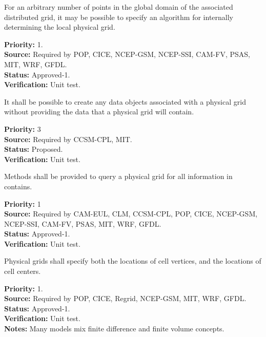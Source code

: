 For an arbitrary number of points in the global domain of the associated
distributed grid, it may be possible to specify an algorithm for internally
determining the local physical grid.
\begin{reqlist}
{\bf Priority:} 1. \\
{\bf Source:} Required by POP, CICE, NCEP-GSM, NCEP-SSI,
              CAM-FV, PSAS, MIT, WRF, GFDL. \\
{\bf Status:} Approved-1. \\
{\bf Verification:} Unit test.
\end{reqlist}

It shall be possible to create any data objects associated with a physical grid without
providing the data that a physical grid will contain.
\begin{reqlist}
{\bf Priority:} 3\\
{\bf Source:} Required by CCSM-CPL, MIT. \\
{\bf Status:} Proposed. \\
{\bf Verification:} Unit test. 
\end{reqlist}

Methods shall be provided to query a physical grid for all information in contains.
\begin{reqlist}
{\bf Priority:} 1\\
{\bf Source:} Required by CAM-EUL, CLM, CCSM-CPL, POP, CICE, NCEP-GSM, NCEP-SSI,
              CAM-FV, PSAS, MIT, WRF, GFDL. \\
{\bf Status:} Approved-1. \\
{\bf Verification:} Unit test.
\end{reqlist}

Physical grids shall specify both the locations of cell vertices, and the locations
of cell centers.
\begin{reqlist}
{\bf Priority:} 1. \\
{\bf Source:} Required by POP, CICE, Regrid, NCEP-GSM, MIT, WRF, GFDL. \\
{\bf Status:} Approved-1. \\
{\bf Verification:} Unit test.\\
{\bf Notes:} Many models mix finite difference and finite volume concepts.
\end{reqlist}


